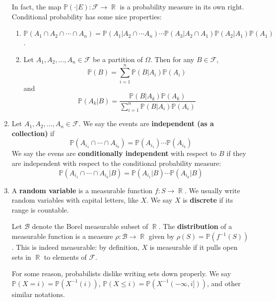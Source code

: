 \documentclass[12pt, a4paper]{article}
\DeclareMathOperator{\R}{\mathbb{R}}
\renewcommand{\Pr}{\mathbb{P}}
\theoremstyle{nonumberplain}
\begin{document}
\begin{enumerate}
        In fact, the map $\Pr(\cdot|E):\mathcal{F}\to\R$ is a probability measure in its own right.
        Conditional probability has some nice properties:
        \begin{enumerate}
            \item $\Pr(A_1\cap A_2\cap\cdots\cap A_n)=\Pr(A_1|A_2\cap\cdots A_n)\cdots\Pr(A_3|A_2\cap A_1)\Pr(A_2|A_1)\Pr(A_1)$.
            \item Let $A_1,A_2,\ldots,A_n\in\mathcal{F}$ be a partition of $\Omega$.
                Then for any $B\in\mathcal{F}$,
                \[\Pr(B)=\sum\limits_{i=1}^n\Pr(B|A_i)\Pr(A_i)\]
                and
                \[\Pr(A_k|B)=\frac{\Pr(B|A_k)\Pr(A_k)}{\sum\limits_{i=1}^n\Pr(B|A_i)\Pr(A_i)}\]
        \end{enumerate}
    \item Let $A_1,A_2,\ldots,A_n\in\mathcal{F}$.
        We say the events are \textbf{independent (as a collection)} if
        \[\Pr(A_{i_1}\cap\cdots\cap A_{i_k})=\Pr(A_{i_1})\cdots\Pr(A_{i_k})\]
        We say the evens are \textbf{conditionally independent} with respect to $B$ if they are independent with respect to the conditional probability measure:
        \[\Pr(A_{i_1}\cap\cdots\cap A_{i_k}|B)=\Pr(A_{i_1}|B)\cdots\Pr(A_{i_k}|B)\]
    \item A \textbf{random variable} is a measurable function $f:S\to\R$.
        We usually write random variables with capital letters, like $X$.
        We say $X$ is \textbf{discrete} if its range is countable.

        Let $\mathcal{B}$ denote the Borel measurable subset of $\R$.
        The \textbf{distribution} of a measurable function is a measure $\rho:\mathcal{B}\to\R$ given by $\rho(S)=\Pr(f^{-1}(S))$.
        This is indeed measurable: by definition, $X$ is measurable if it pulls open sets in $\R$ to elements of $\mathcal{F}$.

        For some reason, probabilists dislike writing sets down properly.
        We say $\Pr(X=i)=\Pr(X^{-1}(i))$, $\Pr(X\leq i)=\Pr(X^{-1}(-\infty,i]))$, and other similar notations.


\end{enumerate}
\end{document}
